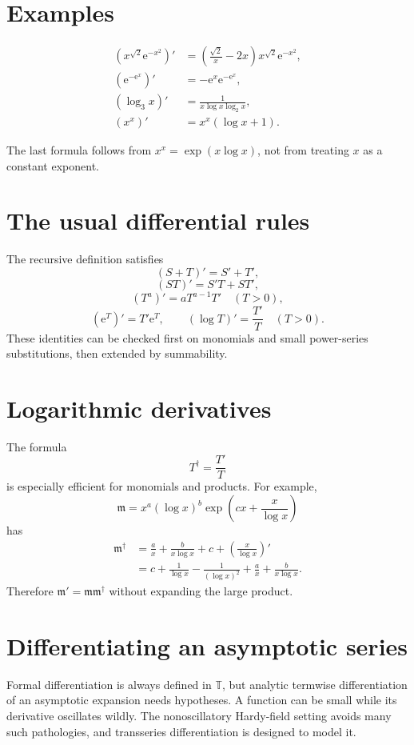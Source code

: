 \documentclass[11pt,oneside]{book}
\theoremstyle{definition}
\theoremstyle{remark}
\newcommand{\T}{\mathbb{T}}
\newcommand{\m}{\mathfrak{m}}
\newcommand{\e}{\mathrm{e}}
\begin{document}
\section{Examples}

\begin{align*}
  (x^{\sqrt2}\e^{-x^2})'
  &=\left(\frac{\sqrt2}{x}-2x\right)x^{\sqrt2}\e^{-x^2},\\
  (\e^{-\e^x})'
  &=-\e^x\e^{-\e^x},\\
  (\log_3x)'
  &=\frac1{x\log x\log_2x},\\
  (x^x)'
  &=x^x(\log x+1).
\end{align*}

The last formula follows from $x^x=\exp(x\log x)$, not from treating $x$ as a
constant exponent.

\section{The usual differential rules}

The recursive definition satisfies
\[
  (S+T)'=S'+T',
\]
\[
  (ST)'=S'T+ST',
\]
\[
  (T^a)'=aT^{a-1}T'\quad(T>0),
\]
\[
  (\e^T)'=T'\e^T,
  \qquad
  (\log T)'=\frac{T'}{T}\quad(T>0).
\]
These identities can be checked first on monomials and small power-series
substitutions, then extended by summability.

\section{Logarithmic derivatives}

The formula
\[
  T^\dagger=\frac{T'}{T}
\]
is especially efficient for monomials and products. For example,
\[
  \m=x^a(\log x)^b
      \exp\!\left(cx+\frac{x}{\log x}\right)
\]
has
\begin{align*}
  \m^\dagger
  &=\frac{a}{x}+\frac{b}{x\log x}+c
    +\left(\frac{x}{\log x}\right)'\\
  &=c+\frac1{\log x}-\frac1{(\log x)^2}
    +\frac{a}{x}+\frac{b}{x\log x}.
\end{align*}
Therefore $\m'=\m\m^\dagger$ without expanding the large product.

\section{Differentiating an asymptotic series}

Formal differentiation is always defined in $\T$, but analytic termwise
differentiation of an asymptotic expansion needs hypotheses. A function can be
small while its derivative oscillates wildly. The nonoscillatory Hardy-field
setting avoids many such pathologies, and transseries differentiation is
designed to model it.
\end{document}
